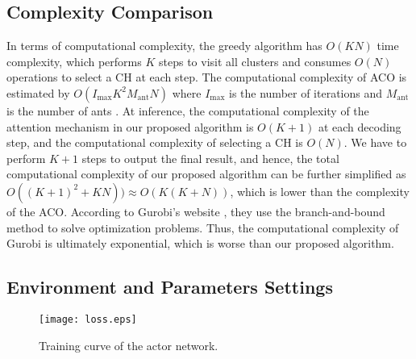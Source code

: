 \documentclass[journal]{IEEEtran}
\begin{document}
{\subsection{Complexity Comparison}
In terms of computational complexity, the greedy algorithm has $O(KN)$ time complexity, which performs $K$ steps to visit all clusters and consumes $O(N)$ operations to select a CH at each step. The computational complexity of ACO is estimated by $O(I_{\text{max}}K^2M_{\text{ant}}N)$ where $I_{\text{max}}$ is the number of iterations and $M_{\text{ant}}$ is the number of ants \cite{J. Yang}. At inference, the computational complexity of the attention mechanism in our proposed algorithm is $O(K+1)$ at each decoding step, and the computational complexity of selecting a CH is $O(N)$. We have to perform $K+1$ steps to output the final result, and hence, the total computational complexity of our proposed algorithm can be further simplified as $O((K+1)^2+KN)) \approx O(K(K+N))$, which is lower than the complexity of the ACO.  According to Gurobi's website \cite{gurobi}, they use the branch-and-bound method to solve optimization problems. Thus, the computational complexity of Gurobi is ultimately exponential, which is worse than our proposed algorithm.}


\subsection{Environment and Parameters Settings}



\begin{figure}[!t]
	\centering
	\texttt{[image: loss.eps]}
	\caption{{Training curve of the actor network.}}
	\label{loss}
\end{figure}
\end{document}
